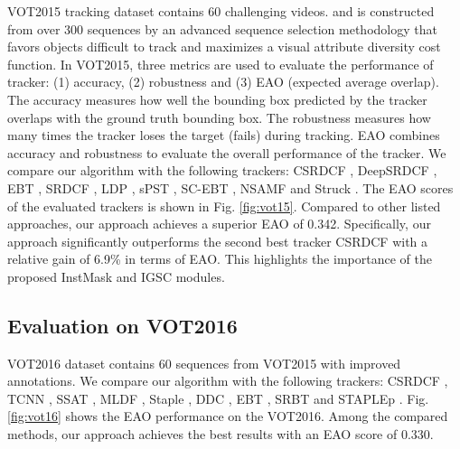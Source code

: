 \documentclass[review]{elsarticle}
\begin{document}
VOT2015 \cite{Kristan2015TheVO} tracking dataset contains 60 challenging videos. and is constructed from over 300 sequences by an advanced sequence selection methodology that favors objects difficult to track and maximizes a visual attribute diversity cost function. In VOT2015, three metrics are used to evaluate the performance of  tracker: (1) accuracy, (2) robustness and (3) EAO (expected average overlap). The accuracy measures how well the bounding box predicted by the tracker overlaps with the ground truth bounding box. The robustness measures how many times the tracker loses the target (fails) during tracking. EAO combines accuracy and robustness to evaluate the overall performance of the tracker. We compare our algorithm with the following trackers: CSRDCF \cite{Lukezic2017DiscriminativeCF}, DeepSRDCF \cite{Danelljan2015ConvolutionalFF}, EBT \cite{Zhu2016BeyondLS}, SRDCF \cite{Danelljan2015LearningSR}, LDP \cite{Kristan2015TheVO}, sPST \cite{Hua2015OnlineOT}, SC-EBT \cite{Hua2015OnlineOT}, NSAMF \cite{Hua2015OnlineOT} and Struck \cite{Hare2011StruckSO}. The EAO scores of the evaluated trackers is shown in Fig. \ref{fig:vot15}. Compared to other listed approaches, our approach achieves a superior EAO of 0.342. Specifically, our approach significantly outperforms the second best tracker CSRDCF with a relative gain of 6.9\% in terms of EAO. This highlights the importance of the proposed InstMask and IGSC modules.

\subsection{Evaluation on VOT2016}
VOT2016 \cite{Kristan2016TheVO} dataset contains 60 sequences from VOT2015 with improved annotations. We compare our algorithm with the following trackers: CSRDCF \cite{Lukezic2017DiscriminativeCF}, TCNN \cite{Kristan2016TheVO}, SSAT \cite{Nam2016LearningMC}, MLDF \cite{Wang2015VisualTW}, Staple \cite{Bertinetto2016StapleC}, DDC \cite{Kristan2016TheVO}, EBT \cite{Zhu2016BeyondLS}, SRBT \cite{Kristan2016TheVO} and STAPLEp \cite{Bertinetto2016StapleC}. Fig. \ref{fig:vot16} shows the EAO performance on the VOT2016. Among the compared methods, our approach achieves the best results with an EAO score of 0.330.
\end{document}
